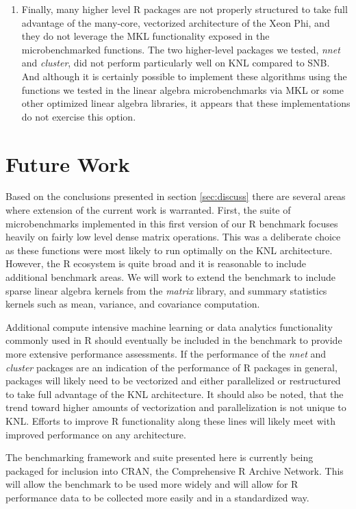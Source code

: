 \begin{enumerate}
\item Finally, many higher level R packages are not properly structured to take full
advantage of the many-core, vectorized architecture of the Xeon Phi, and they do not
leverage the MKL functionality exposed in the microbenchmarked functions. The two
higher-level packages we tested, \textit{nnet} and \textit{cluster}, did not perform
particularly well on KNL compared to SNB. And although it is certainly possible to
implement these algorithms using the functions we tested in the linear algebra
microbenchmarks via MKL or some other optimized linear algebra libraries, it appears that
these implementations do not exercise this option.

\end{enumerate}

\section{Future Work} \label{sec:future}
Based on the conclusions presented in section \ref{sec:discuss} there are several areas
where extension of the current work is warranted. First, the suite of microbenchmarks
implemented in this first version of our R benchmark focuses heavily on fairly low level
dense matrix operations. This was a deliberate choice as these functions were most likely
to run optimally on the KNL architecture. However, the R ecosystem is quite broad and it
is reasonable to include additional benchmark areas.
We will work to extend the benchmark to include sparse linear algebra kernels from the
\textit{matrix} library, and summary statistics kernels such as mean, variance, and
covariance computation.

Additional compute intensive machine learning or data analytics functionality commonly
used in R should eventually be included in the benchmark to provide more extensive
performance assessments. If the performance of the \textit{nnet} and \textit{cluster}
packages are an indication of the performance of R packages in general, packages will
likely need to be vectorized and either parallelized or restructured to take full
advantage of the KNL architecture. It should also be noted, that the trend toward higher
amounts of vectorization and parallelization is not unique to KNL. Efforts to improve R
functionality along these lines will likely meet with improved performance on any
architecture.

The benchmarking framework and suite presented here is currently being packaged for inclusion into CRAN, the Comprehensive R Archive Network. This will allow the benchmark to be used more widely and will allow for R performance data to be collected more easily and in a standardized way.

